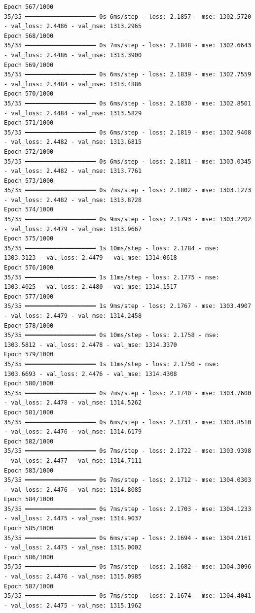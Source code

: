 \documentclass[
  letterpaper,
  DIV=11,
  numbers=noendperiod]{scrreprt}
\begin{document}
\begin{verbatim}
Epoch 567/1000
35/35 ━━━━━━━━━━━━━━━━━━━━ 0s 6ms/step - loss: 2.1857 - mse: 1302.5720 - val_loss: 2.4486 - val_mse: 1313.2965
Epoch 568/1000
35/35 ━━━━━━━━━━━━━━━━━━━━ 0s 7ms/step - loss: 2.1848 - mse: 1302.6643 - val_loss: 2.4486 - val_mse: 1313.3900
Epoch 569/1000
35/35 ━━━━━━━━━━━━━━━━━━━━ 0s 6ms/step - loss: 2.1839 - mse: 1302.7559 - val_loss: 2.4484 - val_mse: 1313.4886
Epoch 570/1000
35/35 ━━━━━━━━━━━━━━━━━━━━ 0s 6ms/step - loss: 2.1830 - mse: 1302.8501 - val_loss: 2.4484 - val_mse: 1313.5829
Epoch 571/1000
35/35 ━━━━━━━━━━━━━━━━━━━━ 0s 6ms/step - loss: 2.1819 - mse: 1302.9408 - val_loss: 2.4482 - val_mse: 1313.6815
Epoch 572/1000
35/35 ━━━━━━━━━━━━━━━━━━━━ 0s 6ms/step - loss: 2.1811 - mse: 1303.0345 - val_loss: 2.4482 - val_mse: 1313.7761
Epoch 573/1000
35/35 ━━━━━━━━━━━━━━━━━━━━ 0s 7ms/step - loss: 2.1802 - mse: 1303.1273 - val_loss: 2.4482 - val_mse: 1313.8728
Epoch 574/1000
35/35 ━━━━━━━━━━━━━━━━━━━━ 0s 9ms/step - loss: 2.1793 - mse: 1303.2202 - val_loss: 2.4479 - val_mse: 1313.9667
Epoch 575/1000
35/35 ━━━━━━━━━━━━━━━━━━━━ 1s 10ms/step - loss: 2.1784 - mse: 1303.3123 - val_loss: 2.4479 - val_mse: 1314.0618
Epoch 576/1000
35/35 ━━━━━━━━━━━━━━━━━━━━ 1s 11ms/step - loss: 2.1775 - mse: 1303.4025 - val_loss: 2.4480 - val_mse: 1314.1517
Epoch 577/1000
35/35 ━━━━━━━━━━━━━━━━━━━━ 1s 9ms/step - loss: 2.1767 - mse: 1303.4907 - val_loss: 2.4479 - val_mse: 1314.2458
Epoch 578/1000
35/35 ━━━━━━━━━━━━━━━━━━━━ 0s 10ms/step - loss: 2.1758 - mse: 1303.5812 - val_loss: 2.4478 - val_mse: 1314.3370
Epoch 579/1000
35/35 ━━━━━━━━━━━━━━━━━━━━ 1s 11ms/step - loss: 2.1750 - mse: 1303.6693 - val_loss: 2.4476 - val_mse: 1314.4308
Epoch 580/1000
35/35 ━━━━━━━━━━━━━━━━━━━━ 0s 7ms/step - loss: 2.1740 - mse: 1303.7600 - val_loss: 2.4478 - val_mse: 1314.5262
Epoch 581/1000
35/35 ━━━━━━━━━━━━━━━━━━━━ 0s 6ms/step - loss: 2.1731 - mse: 1303.8510 - val_loss: 2.4476 - val_mse: 1314.6179
Epoch 582/1000
35/35 ━━━━━━━━━━━━━━━━━━━━ 0s 7ms/step - loss: 2.1722 - mse: 1303.9398 - val_loss: 2.4477 - val_mse: 1314.7111
Epoch 583/1000
35/35 ━━━━━━━━━━━━━━━━━━━━ 0s 7ms/step - loss: 2.1712 - mse: 1304.0303 - val_loss: 2.4476 - val_mse: 1314.8085
Epoch 584/1000
35/35 ━━━━━━━━━━━━━━━━━━━━ 0s 7ms/step - loss: 2.1703 - mse: 1304.1233 - val_loss: 2.4475 - val_mse: 1314.9037
Epoch 585/1000
35/35 ━━━━━━━━━━━━━━━━━━━━ 0s 6ms/step - loss: 2.1694 - mse: 1304.2161 - val_loss: 2.4475 - val_mse: 1315.0002
Epoch 586/1000
35/35 ━━━━━━━━━━━━━━━━━━━━ 0s 7ms/step - loss: 2.1682 - mse: 1304.3096 - val_loss: 2.4476 - val_mse: 1315.0985
Epoch 587/1000
35/35 ━━━━━━━━━━━━━━━━━━━━ 0s 7ms/step - loss: 2.1674 - mse: 1304.4041 - val_loss: 2.4475 - val_mse: 1315.1962

\end{verbatim}
\end{document}
